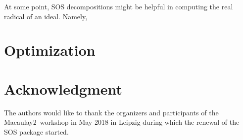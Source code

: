 \documentclass[11pt]{amsart}
\theoremstyle{plain}%
\theoremstyle{definition}
\theoremstyle{remark}
\newcommand{\Mac}{Macaulay2\xspace}
\begin{document}
At some point, SOS decompositions might be helpful in computing the
real radical of an ideal.  Namely,

\section{Optimization}




\section*{Acknowledgment}
\label{sec:acknowledgement}
The authors would like to thank the organizers and participants of the
\Mac\ workshop in May 2018 in Leipzig during which the renewal of the
SOS package started.



\end{document}
